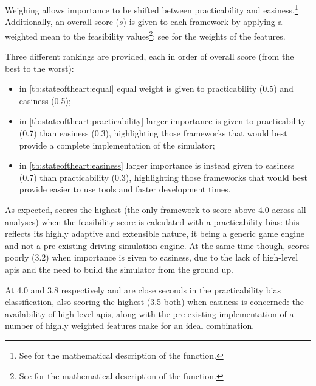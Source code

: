 Weighing allows importance to be shifted between \gls{practicability} and \gls{easiness}.\footnote{See  for the mathematical description of the function.} Additionally, an overall score ($s$) is given to each \gls{framework} by applying a weighted mean to the \gls{feasibility} values\footnote{See  for the mathematical description of the function.}: see  for the weights of the \glspl{feature}.

Three different rankings are provided, each in order of overall score (from the best to the worst):

\begin{itemize}
	\item in \cref{tb:stateoftheart:equal} equal weight is given to \gls{practicability} (\num{0,5}) and \gls{easiness} (\num{0,5});
    \item in \cref{tb:stateoftheart:practicability} larger importance is given to \gls{practicability} (\num{0,7}) than \gls{easiness} (\num{0,3}), highlighting those \glspl{framework} that would best provide a complete implementation of the simulator;
    \item in \cref{tb:stateoftheart:easiness} larger importance is instead given to \gls{easiness} (\num{0,7}) than \gls{practicability} (\num{0,3}), highlighting those \glspl{framework} that would best provide easier to use tools and faster development times.
\end{itemize}



As expected,  scores the highest (the only \gls{framework} to score above \num{4,0} across all analyses) when the \gls{feasibility} score is calculated with a \gls{practicability} bias: this reflects its highly adaptive and extensible nature, it being a generic game engine and not a pre-existing driving simulation engine. At the same time though,  scores poorly (\num{3,2}) when importance is given to easiness, due to the lack of high-level \glspl{api} and the need to build the simulator from the ground up.

At \num{4,0} and \num{3,8} respectively  and  are close seconds in the \gls{practicability} bias classification, also scoring the highest (\num{3,5} both) when \gls{easiness} is concerned: the availability of high-level \glspl{api}, along with the pre-existing implementation of a number of highly weighted \glspl{feature} make for an ideal combination.

